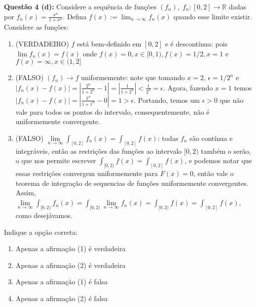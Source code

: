 \documentclass{article}
\begin{document}
\textbf{Questão 4 (d):} Considere a sequência de funções $(f_n), \; f_n: [0,2]
\to \mathbb R$ dadas por $f_n(x) = \frac{x^n}{1+x^n}$. Defina $f(x) := \lim_{n
\to \infty} f_n(x)$ quando esse limite existir. Considere as funções:

\begin{enumerate}
  	\item (VERDADEIRO) $f$ está bem-definido em $[0,2]$ e é descontínua: pois
  $\lim f_n(x) = f(x)$ onde $f(x) = 0, x \in [0,1), f(x) = 1/2, x= 1$ e $f(x) = \infty, x \in (1, 2]$
  
	\item (FALSO) $(f_n) \to f$ uniformemente: note que tomando $x=2$, $\epsilon =
  1/2^n$ e $|f_n(x) - f(x)| = |\frac{2^n}{1+2^n} - 1| = |\frac{1}{1+2^n} | < \frac{1}{2^n} = \epsilon$. Agora,
fazendo $x=1$ temos $|f_n(x) - f(x)| = |\frac{1^n}{1+1^n} - 0| = 1 > \epsilon$.
Portando, temos um $\epsilon> 0$ que não vale para todos os pontos do intervalo,
consequentemente, não é uniformemente convergente.

	\item (FALSO) $\lim \limits_{n \to \infty} \int_{[0,2]} f_n(x) = \int_{[0,2]}
	f(x)$: todas $f_n$ são contínua e integráveis, então as restrições das funções
	ao intervalo $[0,2)$ também o serão, o que nos permite escrever $\int_{[0,2)}
	f(x) = \int_{[0,2]}f(x) $, e podemos notar que essas restrições convergem
	uniformemente para $F(x) = 0$, então vale o teorema de integração de sequencias
	de funções uniformemente convergentes. Assim, $\lim \limits_{n \to \infty}
\int_{[0,2)} f_n(x) = \int_{[0,2)} \lim \limits_{n \to \infty} f_n(x) =
\int_{[0,2)} f(x) = \int_{[0,2]} f(x)$, como desejávamos.

\end{enumerate}

Indique a opção correta:

\begin{enumerate}[label=(\alph*)]
  \item Apenas a afirmação (1) é verdadeira
  \item Apenas a afirmação (2) é verdadeira
  \item Apenas a afirmação (1) é falsa
  \item Apenas a afirmação (2) é falsa
\end{enumerate}
\end{document}
